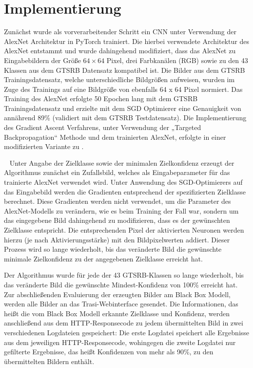 \section{Implementierung}

Zunächst wurde als vorverarbeitender Schritt ein \ac{CNN} unter Verwendung der AlexNet Architektur in PyTorch trainiert. 
Die hierbei verwendete Architektur des AlexNet entstammt \cite{pytorch_datasets_2019} und wurde dahingehend modifiziert, dass das AlexNet zu Eingabebildern der Größe $64 \times 64$ Pixel, drei Farbkanälen (RGB) sowie zu den 43 Klassen aus dem \ac{GTSRB} Datensatz kompatibel ist. 
Die Bilder aus dem \ac{GTSRB} Trainingsdatensatz, welche unterschiedliche Bildgrößen aufweisen, wurden im Zuge des Trainings auf eine Bildgröße von ebenfalls 64 x 64 Pixel normiert. 
Das Training des AlexNet erfolgte 50 Epochen lang mit dem \ac{GTSRB} Trainingsdatensatz und erzielte mit dem \ac{SGD} Optimierer eine Genauigkeit von annährend 89\% (validiert mit dem \ac{GTSRB} Testdatensatz).
Die Implementierung des Gradient Ascent Verfahrens, unter Verwendung der „Targeted Backpropagation“ Methode und dem trainierten AlexNet, erfolgte in einer modifizierten Variante zu \cite{ozbulak_pytorch_2019}. 

~\newline
Unter Angabe der Zielklasse sowie der minimalen Zielkonfidenz erzeugt der Algorithmus zunächst ein Zufallsbild, welches als Eingabeparameter für das trainierte AlexNet verwendet wird. Unter Anwendung des SGD-Optimierers auf das Eingabebild werden die Gradienten entsprechend der spezifizierten Zielklasse berechnet. 
Diese Gradienten werden nicht verwendet, um die Parameter des AlexNet-Modells zu verändern, wie es beim Training der Fall war, sondern um das eingegebene Bild dahingehend zu modifizieren, dass es der gewünschten Zielklasse entspricht. 
Die entsprechenden Pixel der aktivierten Neuronen werden hierzu (je nach Aktivierungsstärke) mit den Bildpixelwerten addiert. 
Dieser Prozess wird so lange wiederholt, bis das veränderte Bild die gewünschte minimale Zielkonfidenz zu der angegebenen Zielklasse erreicht hat.
~\newline

Der Algorithmus wurde für jede der 43 \ac{GTSRB}-Klassen so lange wiederholt, bis das veränderte Bild die gewünschte Mindest-Konfidenz von 100\% erreicht hat.
Zur abschließenden Evaluierung der erzeugten Bilder am Black Box Modell, werden alle Bilder an das Trasi-Webinterface gesendet. Die Informationen, das heißt die vom Black Box Modell erkannte Zielklasse und Konfidenz, werden anschließend aus dem HTTP-Responsecode zu jedem übermittelten Bild in zwei verschiedenen Logdateien gespeichert: Die erste Logdatei speichert alle Ergebnisse aus dem jeweiligen HTTP-Responsecode, wohingegen die zweite Logdatei nur gefilterte Ergebnisse, das heißt Konfidenzen von mehr als 90\%, zu den übermittelten Bildern enthält.




